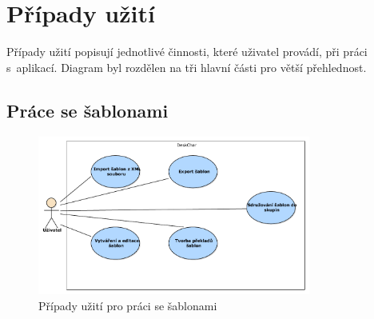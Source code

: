 \documentclass[thesis=B,czech]{resources/FITthesis}[2012/06/26]
\begin{document}
	\section{Případy užití}
Případy užití popisují jednotlivé činnosti, které uživatel provádí, při práci s~aplikací. Diagram byl rozdělen na tři hlavní části pro větší přehlednost.
\subsection{Práce se šablonami}
\begin{figure}\centering
	\includegraphics[width=0.8\textwidth]{images/usecase_sablony.pdf}
	\caption[Případy užití pro šablony]{Případy užití pro práci se šablonami}\label{fig:uc_sablony}
\end{figure}
\end{document}
